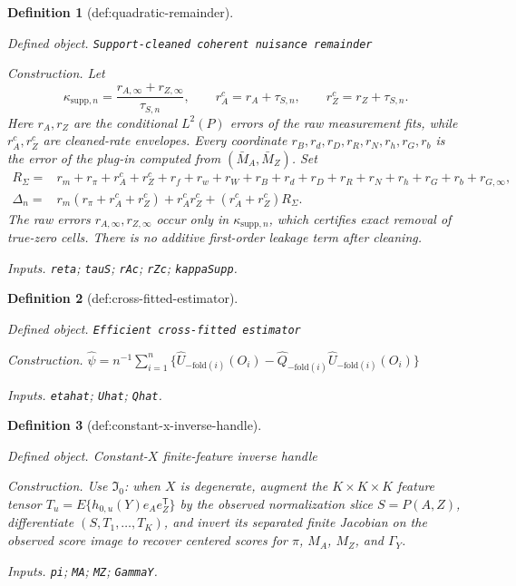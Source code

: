\documentclass{article}
\newtheorem{definition}{Definition}
\begin{document}
\begin{definition}[def:quadratic-remainder]\label{def:quadratic-remainder}
\par\smallskip\noindent\emph{Defined object.} \texttt{Support-\allowbreak{}cleaned coherent nuisance remainder}
\par\smallskip\noindent\emph{Construction.} Let
\[
 \kappa_{\mathrm{supp},n}
 =\frac{r_{A,\infty}+r_{Z,\infty}}{\tau_{S,n}},
 \qquad
 r_A^c=r_A+\tau_{S,n},
 \qquad
 r_Z^c=r_Z+\tau_{S,n}.
\]
Here \(r_A,r_Z\) are the conditional \(L^2(P)\) errors of the raw measurement fits, while \(r_A^c,r_Z^c\) are cleaned-rate envelopes.  Every coordinate \(r_B,r_d,r_D,r_R,r_N,r_h,r_G,r_b\) is the error of the plug-in computed from \((\bar M_A,\bar M_Z)\).  Set
\[
\begin{aligned}
 R_\Sigma={}&r_m+r_\pi+r_A^c+r_Z^c+r_f+r_w+r_W+r_B+r_d+r_D
 +r_R+r_N+r_h+r_G+r_b+r_{G,\infty},\\
 \Delta_n={}&r_m(r_\pi+r_A^c+r_Z^c)+r_A^cr_Z^c
 +(r_A^c+r_Z^c)R_\Sigma.
\end{aligned}
\]
The raw errors \(r_{A,\infty},r_{Z,\infty}\) occur only in \(\kappa_{\mathrm{supp},n}\), which certifies exact removal of true-zero cells.  There is no additive first-order leakage term after cleaning.
\par\smallskip\noindent\emph{Inputs.} \texttt{reta}; \texttt{tauS}; \texttt{rAc}; \texttt{rZc}; \texttt{kappaSupp}.
\end{definition}

\begin{definition}[def:cross-fitted-estimator]\label{def:cross-fitted-estimator}
\par\smallskip\noindent\emph{Defined object.} \texttt{Efficient cross-\allowbreak{}fitted estimator}
\par\smallskip\noindent\emph{Construction.} \(\widehat\psi=n^{-1}\sum_{i=1}^{n}\{\widehat U_{-\mathrm{fold}(i)}(O_i)-\widehat Q_{-\mathrm{fold}(i)}\widehat U_{-\mathrm{fold}(i)}(O_i)\}\)
\par\smallskip\noindent\emph{Inputs.} \texttt{etahat}; \texttt{Uhat}; \texttt{Qhat}.
\end{definition}

\begin{definition}[def:constant-x-inverse-handle]\label{def:constant-x-inverse-handle}
\par\smallskip\noindent\emph{Defined object.} Constant-\(X\) finite-feature inverse handle
\par\smallskip\noindent\emph{Construction.} Use \(\mathfrak I_0\): when \(X\) is degenerate, augment the \(K\times K\times K\) feature tensor \(T_u=E\{h_{0,u}(Y)e_Ae_Z^{\mathsf T}\}\) by the observed normalization slice \(S=P(A,Z)\), differentiate \((S,T_1,\ldots,T_K)\), and invert its separated finite Jacobian on the observed score image to recover centered scores for \(\pi\), \(M_A\), \(M_Z\), and \(\Gamma_Y\).
\par\smallskip\noindent\emph{Inputs.} \texttt{pi}; \texttt{MA}; \texttt{MZ}; \texttt{GammaY}.
\end{definition}
\end{document}

